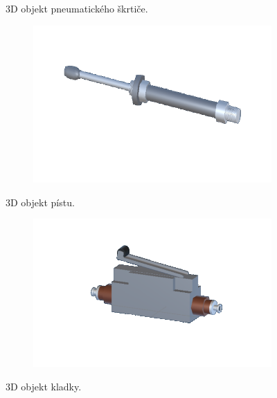 \documentclass[12pt, a4paper,
twoside,        %
openright
]{report}
\begin{document}
\begin{figure}[h!]
\begin{subfigure}[h]{0.5\textwidth}
	\end{subfigure}
	\caption[3D objekt pneumatického škrtiče]{3D objekt pneumatického škrtiče.}
	\label{fig:skrtic}
\end{figure}



\begin{figure}[h!] \centering
	\begin{subfigure}[h]{0.63\textwidth}
		\includegraphics[width=\textwidth]{image/pist.png}
	\end{subfigure}
	\caption[3D objekt pístu]{3D objekt pístu.}
	\label{fig:pist}
	\begin{subfigure}[h]{0.63\textwidth}
		\includegraphics[width=\textwidth]{image/kladka.png} 
	\end{subfigure}
	\caption[3D objekt kladky]{3D objekt kladky.}
	\label{fig:kladka}

	
\end{figure}
\end{document}
